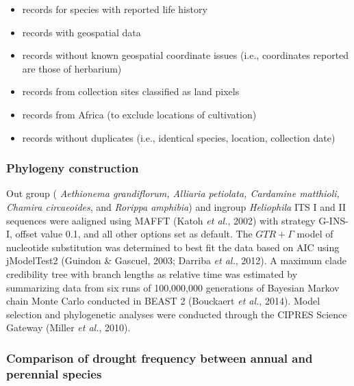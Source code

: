 \documentclass[man,floatsintext]{apa6}
\providecommand{\tightlist}{%
  \setlength{\itemsep}{0pt}\setlength{\parskip}{0pt}}
\theoremstyle{definition}
\theoremstyle{definition}
\theoremstyle{definition}
\theoremstyle{remark}
\begin{document}
\begin{itemize}
\tightlist
\item
  records for species with reported life history\\
\item
  records with geospatial data\\
\item
  records without known geospatial coordinate issues (i.e., coordinates
  reported are those of herbarium)\\
\item
  records from collection sites classified as land pixels\\
\item
  records from Africa (to exclude locations of cultivation)
\item
  records without duplicates (i.e., identical species, location,
  collection date)
\end{itemize}

\hypertarget{phylogeny-construction}{%
\subsubsection{Phylogeny construction}\label{phylogeny-construction}}

Out group ( \emph{Aethionema grandiflorum, Alliaria petiolata, Cardamine
matthioli, Chamira circaeoides}, and \emph{Rorippa amphibia}) and
ingroup \emph{Heliophila} ITS I and II sequences were aaligned using
MAFFT (Katoh \emph{et al.}, 2002) with strategy G-INS-I, offset value
0.1, and all other options set as default. The \(GTR + \Gamma\) model of
nucleotide substitution was determined to best fit the data based on AIC
using jModelTest2 (Guindon \& Gascuel, 2003; Darriba \emph{et al.},
2012). A maximum clade credibility tree with branch lengths as relative
time was estimated by summarizing data from six runs of 100,000,000
generations of Bayesian Markov chain Monte Carlo conducted in BEAST 2
(Bouckaert \emph{et al.}, 2014). Model selection and phylogenetic
analyses were conducted through the CIPRES Science Gateway (Miller
\emph{et al.}, 2010).

\hypertarget{comparison-of-drought-frequency-between-annual-and-perennial-species}{%
\subsubsection{Comparison of drought frequency between annual and
perennial
species}\label{comparison-of-drought-frequency-between-annual-and-perennial-species}}
\end{document}
